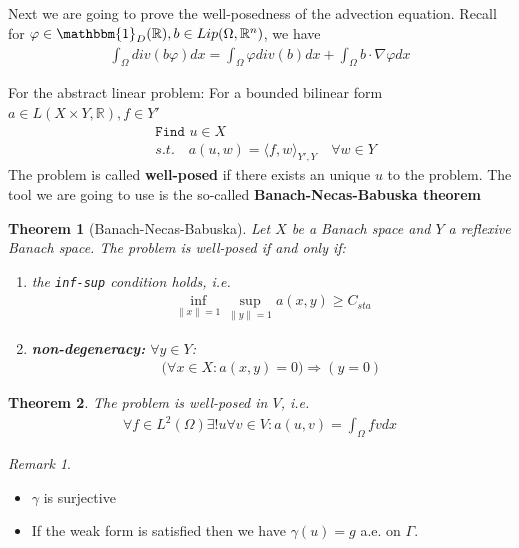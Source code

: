\documentclass[a4paper,11pt,oneside,fleqn]{book}
\newtheorem{theorem}{Theorem}[section]
\theoremstyle{definition}
\theoremstyle{remark}
\newtheorem*{remark}{Remark}
\begin{document}
Next we are going to prove the well-posedness of the advection equation. Recall for $\varphi \in \mathbbm{1}_{D}(\mathbb{R}), b \in Lip(\Omega, \mathbb{R}^n)$, we have
\begin{align*}
	\int_\Omega div(b \varphi ) dx = \int_\Omega \varphi div(b) dx + \int_\Omega b \cdot \nabla \varphi dx 
\end{align*}




For the abstract linear problem: For a bounded bilinear form $a \in L(X \times Y, \mathbb{R}), f \in Y'$
\begin{align*}
	&\texttt{Find } u \in X\\
	&s.t.\quad a(u, w) = \langle f, w \rangle_{Y', Y} \quad \forall w \in Y 
\end{align*}
The problem is called \textbf{well-posed} if there exists an unique $u$ to the problem. 
The tool we are going to use is the so-called \textbf{Banach-Necas-Babuska theorem}

\begin{theorem}[Banach-Necas-Babuska]
	Let $X$ be a Banach space and $Y$ a reflexive Banach space. The problem is well-posed if and only if:
	\begin{enumerate}
		\item the \texttt{inf-sup} condition holds, i.e.
		\begin{align*}
			\inf_{\|x\| = 1} \sup_{\|y\|= 1} a(x, y) \geq C_{sta}
		\end{align*}
		\item \textbf{non-degeneracy:}  $\forall y \in Y$:
		\begin{align*}
			\bigg(\forall x \in X:a(x, y) = 0 \bigg)\Rightarrow (y = 0)
		\end{align*}
	\end{enumerate}
\end{theorem}

\begin{theorem}
	The problem is well-posed in $V$, i.e. 
	\begin{align*}
		\forall f \in L^2(\Omega) \exists! u \forall v \in V: a(u, v) = \int_\Omega fv dx
	\end{align*}
\end{theorem}
\begin{remark}
\quad
\begin{itemize}
	\item $\gamma$ is surjective
	\item If the weak form is satisfied then we have $\gamma(u) = g$ a.e. on $\Gamma$. 
\end{itemize}
\end{remark}
\end{document}
